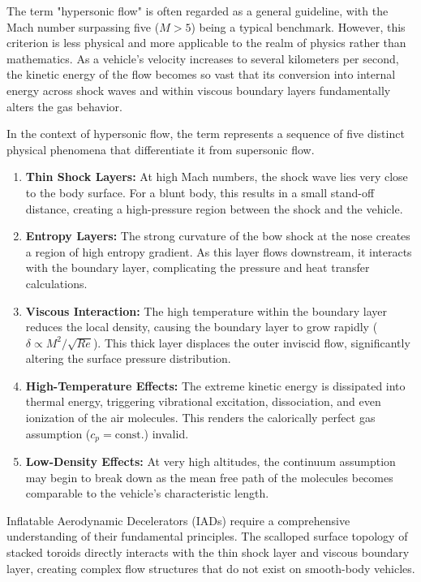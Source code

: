 \par
The term "hypersonic flow" is often regarded as a general guideline, with the Mach number surpassing five ($M > 5$) being a typical benchmark. However, this criterion is less physical and more applicable to the realm of physics rather than mathematics. As a vehicle's velocity increases to several kilometers per second, the kinetic energy of the flow becomes so vast that its conversion into internal energy across shock waves and within viscous boundary layers fundamentally alters the gas behavior.
\par
In the context of hypersonic flow, the term \cite{AndersonHypersonic}represents a sequence of five distinct physical phenomena that differentiate it from supersonic flow.
\par
\begin{enumerate}
    \item \textbf{Thin Shock Layers:} At high Mach numbers, the shock wave lies very close to the body surface. For a blunt body, this results in a small stand-off distance, creating a high-pressure region between the shock and the vehicle.

    \item \textbf{Entropy Layers:} The strong curvature of the bow shock at the nose creates a region of high entropy gradient. As this layer flows downstream, it interacts with the boundary layer, complicating the pressure and heat transfer calculations.

    \item \textbf{Viscous Interaction:} The high temperature within the boundary layer reduces the local density, causing the boundary layer to grow rapidly ($\delta \propto M^2/\sqrt{Re}$). This thick layer displaces the outer inviscid flow, significantly altering the surface pressure distribution.

    \item \textbf{High-Temperature Effects:} The extreme kinetic energy is dissipated into thermal energy, triggering vibrational excitation, dissociation, and even ionization of the air molecules. This renders the calorically perfect gas assumption ($c_p = \text{const.}$) invalid.

    \item \textbf{Low-Density Effects:} At very high altitudes, the continuum assumption may begin to break down as the mean free path of the molecules becomes comparable to the vehicle's characteristic length.
\end{enumerate}
\par
Inflatable Aerodynamic Decelerators (IADs) require a comprehensive understanding of their fundamental principles. The scalloped surface topology of stacked toroids directly interacts with the thin shock layer and viscous boundary layer, creating complex flow structures that do not exist on smooth-body vehicles.
\par

